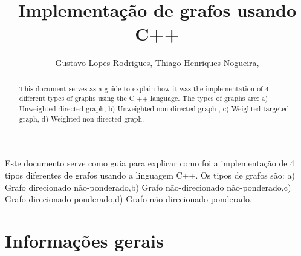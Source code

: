 \documentclass[12pt]{article}
\title{Implementação de grafos usando C++}
\author{Gustavo Lopes Rodrigues\inst{1}, Thiago Henriques Nogueira\inst{2},}
\begin{document}
 

\maketitle

\begin{abstract} 
  This document serves as a guide to explain how it
  was the implementation
  of 4 different types of graphs using the C ++ language. The types of
  graphs are: a) Unweighted directed graph, b) Unweighted non-directed graph
  , c) Weighted targeted graph, d) Weighted non-directed graph.
\end{abstract}

\begin{resumo} 
  Este documento serve como guia para explicar como 
  foi a implementação
  de 4 tipos diferentes de grafos usando a linguagem C++. Os tipos de 
  grafos são: a) Grafo direcionado não-ponderado,b) Grafo não-direcionado 
  não-ponderado,c) Grafo direcionado ponderado,d) Grafo não-direcionado 
  ponderado.
\end{resumo}


\section{Informações gerais}
\end{document}
